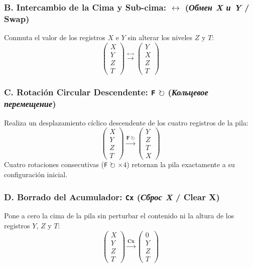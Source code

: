 \documentclass[11pt,a4paper]{article}
\begin{document}
\subsubsection{B. Intercambio de la Cima y Sub-cima: \texorpdfstring{\texttt{$\leftrightarrow$}}{Swap} (\textit{Обмен X и Y} / Swap)}
Conmuta el valor de los registros $X$ e $Y$ sin alterar los niveles $Z$ y $T$:
\[
\begin{pmatrix} X \\ Y \\ Z \\ T \end{pmatrix} \xrightarrow{\mathbf{\leftrightarrow}} \begin{pmatrix} Y \\ X \\ Z \\ T \end{pmatrix}
\]

\subsubsection{C. Rotación Circular Descendente: \texorpdfstring{\texttt{F} $\circlearrowright$}{F Rotacion} (\textit{Кольцевое перемещение})}
Realiza un desplazamiento cíclico descendente de los cuatro registros de la pila:
\[
\begin{pmatrix} X \\ Y \\ Z \\ T \end{pmatrix} \xrightarrow{\mathbf{F\ \circlearrowright}} \begin{pmatrix} Y \\ Z \\ T \\ X \end{pmatrix}
\]
Cuatro rotaciones consecutivas (\texttt{F} $\circlearrowright$ $\times 4$) retornan la pila exactamente a su configuración inicial.

\subsubsection{D. Borrado del Acumulador: \texttt{Сх} (\textit{Сброс X} / Clear X)}
Pone a cero la cima de la pila sin perturbar el contenido ni la altura de los registros $Y$, $Z$ y $T$:
\[
\begin{pmatrix} X \\ Y \\ Z \\ T \end{pmatrix} \xrightarrow{\mathbf{Cx}} \begin{pmatrix} 0 \\ Y \\ Z \\ T \end{pmatrix}
\]
\end{document}
